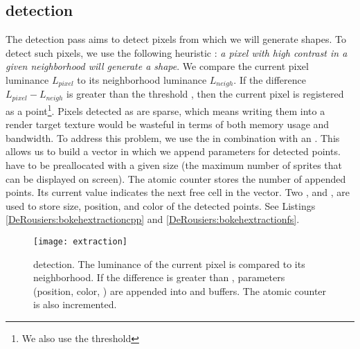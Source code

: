\subsection{\Bokeh detection}
The detection pass aims to detect pixels from which we will generate \bokeh shapes. To detect such pixels, we use the following heuristic : \emph{a pixel with high contrast in a given neighborhood will generate a \bokeh shape}. We compare the current pixel luminance $L_{pixel}$ to its neighborhood luminance $L_{neigh}$. If the difference $L_{pixel}-L_{neigh}$ is greater than the threshold , then the current pixel is registered as a \bokeh point\footnote{We also use the threshold }. Pixels detected as \bokeh are sparse, which means writing them into a render target texture would be wasteful in terms of both memory usage and bandwidth. To address this problem, we use the \opengl {} in combination with an . This allows us to build a vector in which we append parameters for detected \bokeh points.  have to be preallocated with a given size (\ie the maximum number of \bokeh sprites that can be displayed on screen). The atomic counter  stores the number of appended \bokeh points. Its current value indicates the next free cell in the  vector. Two ,  and , are used to store \coc size, position, and color of the detected \bokeh points. See Listings \ref{DeRousiers:bokehextractioncpp} and \ref{DeRousiers:bokehextractionfs}.

	\begin{figure}[htb]\centering
	\texttt{[image: extraction]}
	\caption{\Bokeh detection. The luminance of the current pixel is compared to its neighborhood. If the difference is greater than , \bokeh parameters (position, color, \coc) are appended into  and  buffers. The atomic counter  is also incremented.}
	\label{DeRousiers:detection}
	\end{figure}

